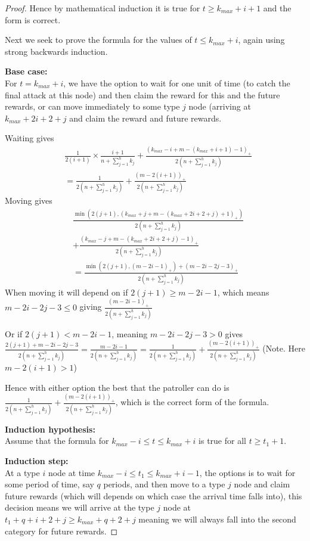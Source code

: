\documentclass[a4paper,10pt]{article}
\newcommand{\denominator}{\ensuremath{n+\sum\limits_{j=1}^{h} k_{j}}}
\newcommand{\pospart}[1]{\left( #1 \right)_{+}}
\theoremstyle{definition}
\theoremstyle{definition}
\theoremstyle{remark}
\theoremstyle{definition}
\begin{document}
\begin{proof}
Hence by mathematical induction it is true for $t \geq k_{max}+i+1$ and the form is correct.

Next we seek to prove the formula for the values of $t \leq k_{max}+i$, again using strong backwards induction.

\textbf{Base case:}
\\
For $t=k_{max}+i$, we have the option to wait for one unit of time (to catch the final attack at this node) and then claim the reward for this and the future rewards, or can move immediately to some type $j$ node (arriving at $k_{max}+2i+2+j$ and claim the reward and future rewards.

Waiting gives
\begin{align*}
&\frac{1}{2(i+1)} \times \frac{i+1}{\denominator} +\frac{\pospart{k_{max}-i+m-(k_{max}+i+1)-1}}{2 \left( \denominator \right)} \\
&=\frac{1}{2 \left( \denominator \right)}+\frac{\pospart{m-2(i+1)}}{2 \left( \denominator \right)}
\end{align*}
Moving gives
\begin{align*}
&\frac{\min (2(j+1), \pospart{k_{max}+j+m-(k_{max}+2i+2+j)+1})}{2 \left( \denominator \right)} \\
&+\frac{\pospart{k_{max}-j+m-(k_{max}+2i+2+j)-1}}{2 \left( \denominator \right)} \\
&=\frac{\min (2(j+1),\pospart{m-2i-1})+\pospart{m-2i-2j-3}}{2 \left( \denominator \right)}
\end{align*}
When moving it will depend on if $2(j+1) \geq m-2i-1$, which means $m-2i-2j-3 \leq 0$
giving $\frac{\pospart{m-2i-1}}{2 \left( \denominator \right)}$

Or if $2(j+1) < m-2i-1$, meaning $m-2i-2j-3 >0$ gives $\frac{2(j+1)+m-2i-2j-3}{2 \left( \denominator \right)}=\frac{m-2i-1}{2 \left( \denominator \right)}=\frac{1}{2 \left( \denominator \right)}+\frac{\pospart{m-2(i+1)}}{2 \left( \denominator \right)}$ (Note. Here $m-2(i+1) > 1$)

Hence with either option the best that the patroller can do is
$\frac{1}{2 \left( \denominator \right)}+\frac{\pospart{m-2(i+1)}}{2 \left( \denominator \right)}$, which is the correct form of the formula.

\textbf{Induction hypothesis:}
\\
Assume that the formula for $k_{max}-i \leq t \leq k_{max}+i$ is true for all $t \geq t_{1}+1$.

\textbf{Induction step:}
\\
At a type $i$ node at time $k_{max}-i \leq t_{1} \leq k_{max}+i-1$, the options is to wait for some period of time, say $q$ periods, and then move to a type $j$ node and claim future rewards (which will depends on which case the arrival time falls into), this decision means we will arrive at the type $j$ node at $t_{1}+q+i+2+j \geq k_{max}+q+2+j$ meaning we will always fall into the second category for future rewards.


\end{proof}
\end{document}

